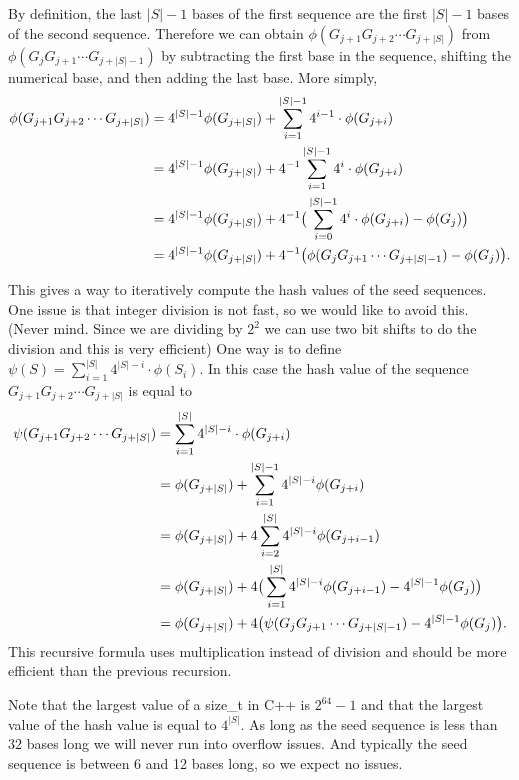 \documentclass{article}[12pt]
\begin{document}
By definition, the last $|S| - 1$ bases of the first sequence
are the first $|S| - 1$ bases of the second sequence.
Therefore we can obtain $\phi(G_{j + 1} G_{j+2} \cdots G_{j + |S|} )$
from $\phi(G_{j} G_{j+1} \cdots G_{j + |S| - 1}) $ by subtracting the 
first base in the sequence, shifting the numerical base, and
then adding the last base.  
More simply,
\begin{align}
\phi(G_{j + 1} G_{j+2} \cdots G_{j + |S|} ) &= 
4^{|S| - 1} \phi( G_{ j + |S|} ) + \sum_{i = 1}^{|S| - 1} 4^{i - 1} \cdot \phi( G_{j + i} )
\notag \\
&= 4^{|S| - 1} \phi( G_{ j + |S|} ) + 4^{-1} \sum_{i = 1}^{|S| - 1} 4^{i} \cdot \phi (G_{j + i}) 
\notag \\
&= 4^{|S| - 1} \phi( G_{ j + |S|} ) + 4^{-1} \big( \sum_{i = 0}^{|S| - 1} 4^{i} \cdot \phi(G_{j + i} )
- \phi(G_{j}) \big)
\notag \\
&= 4^{|S| - 1} \phi( G_{ j + |S|} ) + 4^{-1} \big( \phi(G_{j} G_{j+1} \cdots G_{j + |S| - 1}) - \phi(G_{j}) \big).
\notag
\end{align}

This gives a way to iteratively compute the hash values of
the seed sequences.  One issue is that integer division is 
not fast, so we would like to avoid this. 
(Never mind.  Since we are dividing by $2^2$ we can use two bit shifts
to do the division and this is very efficient)
One way is to define $\psi(S) = \sum_{i = 1}^{|S|} 4^{|S| - i} \cdot \phi(S_{i})$.
In this case the hash value of the sequence
$G_{j+1} G_{j + 2} \cdots G_{j + |S|}$ is equal to
\begin{align}
\psi(G_{j+1} G_{j + 2} \cdots G_{j + |S|})
&= \sum_{i = 1}^{|S|} 4^{|S| - i} \cdot \phi(G_{j + i}) 
\notag  \\
&= \phi(G_{j + |S|}) + \sum_{i = 1}^{|S| - 1} 4^{|S| - i} \phi(G_{j + i})
\notag \\
&= \phi(G_{j + |S|}) + 4 \sum_{i = 2}^{|S|} 4^{|S| - i} \phi(G_{j + i - 1})
\notag \\
&=  \phi(G_{j + |S|}) + 4 \big( \sum_{i = 1}^{|S|} 4^{|S| - i} \phi(G_{j + i - 1})
- 4^{|S| - 1} \phi(G_{j}) \big)
\notag \\
&= \phi(G_{j + |S|}) + 4 \big( \psi(G_{j} G_{j + 1} \cdots G_{j + |S| - 1}) - 4^{|S| - 1} \phi(G_{j}) \big).
\notag
\end{align}
This recursive formula uses multiplication instead of division
and should be more efficient than the previous recursion.

Note that the largest value of a size\_t in C++ is 
$2^{64} - 1$ and that the largest value of the hash value
is equal to $4^{|S|}$.  As long as the seed sequence is less than $32$
bases long we will never run into overflow issues.  And typically the seed
sequence is between 6 and 12 bases long, so we expect no issues.
\end{document}
